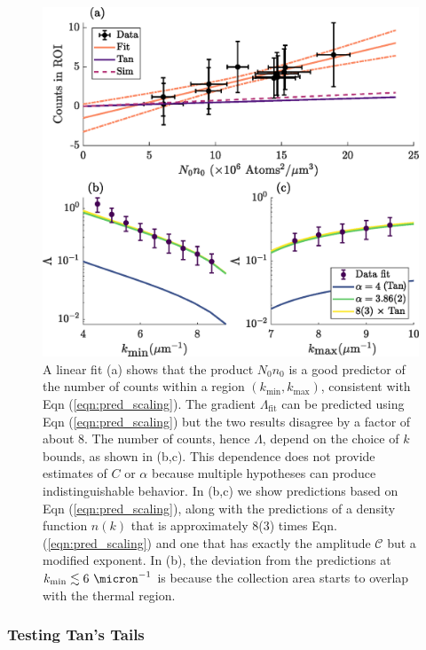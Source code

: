	
	\begin{figure}[t]
	\begin{center}
		\includegraphics[width=\columnwidth]{fig/depletion/exp_results}
			\caption{A linear fit (a) shows that the product $N_0n_0$ is a good predictor of the number of counts within a region $(k_\textrm{min},k_\textrm{max})$, consistent with Eqn (\ref{eqn:pred_scaling}).
	The gradient $\Lambda_\textrm{fit}$ can be predicted using Eqn (\ref{eqn:pred_scaling}) but the two results disagree by a factor of about 8.
	The number of counts, hence $\Lambda$, depend on the choice of $k$ bounds, as shown in (b,c).
	This dependence does not provide estimates of $C$ or $\alpha$ because multiple hypotheses can produce indistinguishable behavior.
	In (b,c) we show predictions based on Eqn (\ref{eqn:pred_scaling}), along with the predictions of a density function $n(k)$ that is approximately 8(3) times Eqn.
	(\ref{eqn:pred_scaling}) and one that has exactly the amplitude $\mathcal{C}$ but a modified exponent.
	In (b), the deviation from the predictions at $k_\textrm{min}\lesssim6~\micron^{-1}$ is because the collection area starts to overlap with the thermal region.
			}

		\label{fig:exp_results}
	\end{center}
	\end{figure}

\subsubsection{Testing Tan's Tails}

